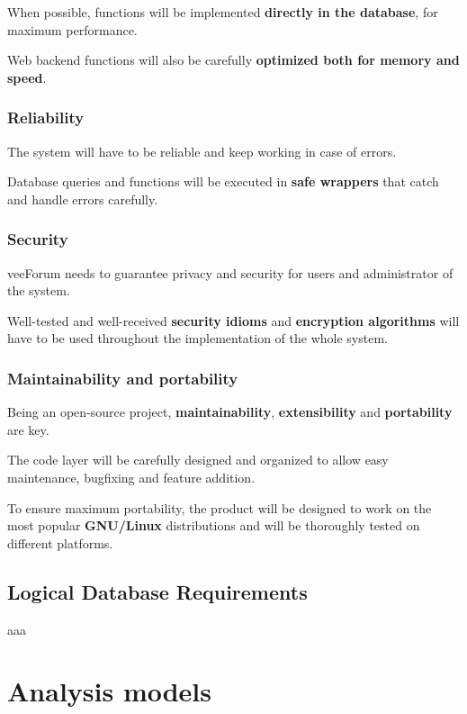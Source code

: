 \documentclass[12pt]{report}
\renewcommand\emph{\textbf}
\begin{document}
                        When possible, functions will be implemented \emph{directly in the database}, for maximum performance.

                        Web backend functions will also be carefully \emph{optimized both for memory and speed}.

                    \subsubsection{Reliability}
                        The system will have to be reliable and keep working in case of errors.

                        Database queries and functions will be executed in \emph{safe wrappers} that catch and handle errors carefully.

                    \subsubsection{Security}
                        veeForum needs to guarantee privacy and security for users and administrator of the system.

                        Well-tested and well-received \emph{security idioms} and \emph{encryption algorithms} will have to be used throughout the implementation of the whole system.

                    \subsubsection{Maintainability and portability}
                        Being an open-source project, \emph{maintainability}, \emph{extensibility} and \emph{portability} are key.

                        The code layer will be carefully designed and organized to allow easy maintenance, bugfixing and feature addition.

                        To ensure maximum portability, the product will be designed to work on the most popular \emph{GNU/Linux} distributions and will be thoroughly tested on different platforms.

                \subsection{Logical Database Requirements}
                    aaa

            \section{Analysis models}
\end{document}
